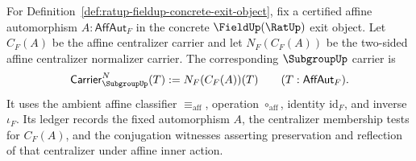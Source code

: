 \begin{definition}
\label{def:ratup-fieldup-affine-normalizer-subgroupup-carrier}
For Definition~\ref{def:ratup-fieldup-concrete-exit-object}, fix a certified
affine automorphism $A:\mathsf{AffAut}_F$ in the concrete $\FieldUp(\RatUp)$
exit object. Let $C_F(A)$ be the affine centralizer carrier and let
$N_F(C_F(A))$ be the two-sided affine centralizer normalizer carrier. The
corresponding $\SubgroupUp$ carrier is
$$
\mathsf{Carrier}^{N}_{\SubgroupUp}(T) := N_F(C_F(A))(T)
\qquad (T:\mathsf{AffAut}_F).
$$
It uses the ambient affine classifier $\equiv_{\mathrm{aff}}$, operation
$\circ_{\mathrm{aff}}$, identity $\mathrm{id}_F$, and inverse $\iota_F$. Its
ledger records the fixed automorphism $A$, the centralizer membership tests
for $C_F(A)$, and the conjugation witnesses asserting preservation and
reflection of that centralizer under affine inner action.
\end{definition}

